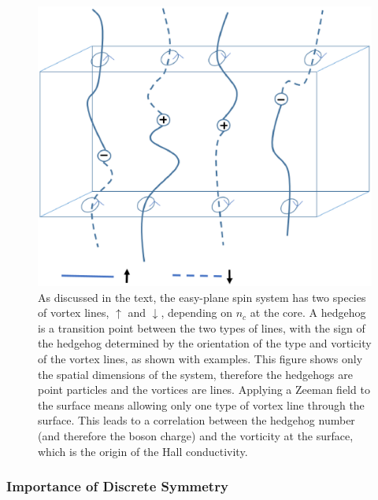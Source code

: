 \begin{figure}
\includegraphics[width=\linewidth]{figures/monopoles.eps}
\caption{As discussed in the text, the easy-plane spin system has two species of vortex lines, $\uparrow$ and $\downarrow$, depending on $n_c$ at the core. A hedgehog is a transition point between the two types of lines, with the sign of the hedgehog determined by the orientation of the type and vorticity of the vortex lines, as shown with examples. This figure shows only the spatial dimensions of the system, therefore the hedgehogs are point particles and the vortices are lines. Applying a Zeeman field to the surface means allowing only one type of vortex line through the surface. This leads to a correlation between the hedgehog number (and therefore the boson charge) and the vorticity at the surface, which is the origin of the Hall conductivity.}
\label{monopoles}
\end{figure}


\subsubsection{Importance of Discrete Symmetry}
\label{subsubsec:HeisSym}

